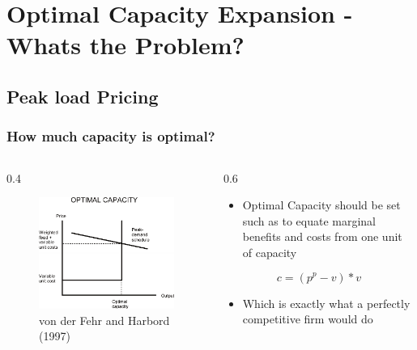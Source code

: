 \section{Optimal Capacity Expansion - Whats the Problem?}

\subsection{Peak load Pricing}

\begin{frame}
\frametitle{How much capacity is optimal?}
\begin{columns}
\begin{column} {0.4\textwidth}

\begin{figure}[h]
\centering
\includegraphics[width=1.\textwidth]{capacity/peak_load_opt}
    \caption{von der Fehr and Harbord (1997)}
    \label{fig:Daten 2004}            
\end{figure}
\end{column}

\begin{column} {0.6\textwidth}
\begin{itemize}
\item Optimal Capacity should be set such as to equate marginal benefits and costs from one unit of capacity
\end {itemize}
  
\begin{equation}
	c=(p^p-v)*v
\end{equation}

\begin{itemize}
\item Which is exactly what a perfectly competitive firm would do
\end {itemize}

\end{column}
\end{columns}
	

\end{frame}